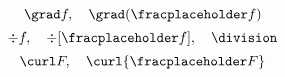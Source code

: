 \[
    \grad f, \quad
    \grad(\fracplaceholder f)
\]
\[
    \div f, \quad
    \div[\fracplaceholder f], \quad
    \division
\]
\[
    \curl F, \quad
    \curl\{\fracplaceholder F\}
\]
